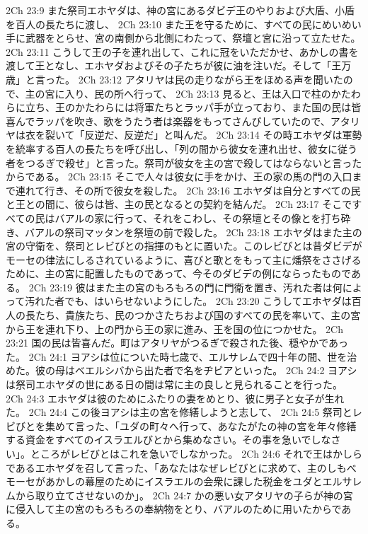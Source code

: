 2Ch 23:9  また祭司エホヤダは、神の宮にあるダビデ王のやりおよび大盾、小盾を百人の長たちに渡し、
2Ch 23:10  また王を守るために、すべての民にめいめい手に武器をとらせ、宮の南側から北側にわたって、祭壇と宮に沿って立たせた。
2Ch 23:11  こうして王の子を連れ出して、これに冠をいただかせ、あかしの書を渡して王となし、エホヤダおよびその子たちが彼に油を注いだ。そして「王万歳」と言った。
2Ch 23:12  アタリヤは民の走りながら王をほめる声を聞いたので、主の宮に入り、民の所へ行って、
2Ch 23:13  見ると、王は入口で柱のかたわらに立ち、王のかたわらには将軍たちとラッパ手が立っており、また国の民は皆喜んでラッパを吹き、歌をうたう者は楽器をもってさんびしていたので、アタリヤは衣を裂いて「反逆だ、反逆だ」と叫んだ。
2Ch 23:14  その時エホヤダは軍勢を統率する百人の長たちを呼び出し、「列の間から彼女を連れ出せ、彼女に従う者をつるぎで殺せ」と言った。祭司が彼女を主の宮で殺してはならないと言ったからである。
2Ch 23:15  そこで人々は彼女に手をかけ、王の家の馬の門の入口まで連れて行き、その所で彼女を殺した。
2Ch 23:16  エホヤダは自分とすべての民と王との間に、彼らは皆、主の民となるとの契約を結んだ。
2Ch 23:17  そこですべての民はバアルの家に行って、それをこわし、その祭壇とその像とを打ち砕き、バアルの祭司マッタンを祭壇の前で殺した。
2Ch 23:18  エホヤダはまた主の宮の守衛を、祭司とレビびとの指揮のもとに置いた。このレビびとは昔ダビデがモーセの律法にしるされているように、喜びと歌とをもって主に燔祭をささげるために、主の宮に配置したものであって、今そのダビデの例にならったものである。
2Ch 23:19  彼はまた主の宮のもろもろの門に門衛を置き、汚れた者は何によって汚れた者でも、はいらせないようにした。
2Ch 23:20  こうしてエホヤダは百人の長たち、貴族たち、民のつかさたちおよび国のすべての民を率いて、主の宮から王を連れ下り、上の門から王の家に進み、王を国の位につかせた。
2Ch 23:21  国の民は皆喜んだ。町はアタリヤがつるぎで殺された後、穏やかであった。
2Ch 24:1  ヨアシは位についた時七歳で、エルサレムで四十年の間、世を治めた。彼の母はベエルシバから出た者で名をヂビアといった。
2Ch 24:2  ヨアシは祭司エホヤダの世にある日の間は常に主の良しと見られることを行った。
2Ch 24:3  エホヤダは彼のためにふたりの妻をめとり、彼に男子と女子が生れた。
2Ch 24:4  この後ヨアシは主の宮を修繕しようと志して、
2Ch 24:5  祭司とレビびとを集めて言った、「ユダの町々へ行って、あなたがたの神の宮を年々修繕する資金をすべてのイスラエルびとから集めなさい。その事を急いでしなさい」。ところがレビびとはこれを急いでしなかった。
2Ch 24:6  それで王はかしらであるエホヤダを召して言った、「あなたはなぜレビびとに求めて、主のしもべモーセがあかしの幕屋のためにイスラエルの会衆に課した税金をユダとエルサレムから取り立てさせないのか」。
2Ch 24:7  かの悪い女アタリヤの子らが神の宮に侵入して主の宮のもろもろの奉納物をとり、バアルのために用いたからである。

